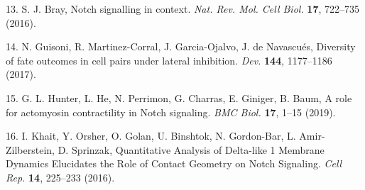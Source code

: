 \documentclass[11pt,singlespacinge,twoside]{reedthesis} %
\begin{document}
\leavevmode\hypertarget{ref-Bray2016}{}%
13. S. J. Bray, Notch signalling in context. \emph{Nat. Rev. Mol. Cell Biol.} \textbf{17}, 722--735 (2016).

\leavevmode\hypertarget{ref-Guisoni2017}{}%
14. N. Guisoni, R. Martinez-Corral, J. Garcia-Ojalvo, J. de Navascués, Diversity of fate outcomes in cell pairs under lateral inhibition. \emph{Dev.} \textbf{144}, 1177--1186 (2017).

\leavevmode\hypertarget{ref-Hunter2019}{}%
15. G. L. Hunter, L. He, N. Perrimon, G. Charras, E. Giniger, B. Baum, A role for actomyosin contractility in Notch signaling. \emph{BMC Biol.} \textbf{17}, 1--15 (2019).

\leavevmode\hypertarget{ref-Khait2016}{}%
16. I. Khait, Y. Orsher, O. Golan, U. Binshtok, N. Gordon-Bar, L. Amir-Zilberstein, D. Sprinzak, Quantitative Analysis of Delta-like 1 Membrane Dynamics Elucidates the Role of Contact Geometry on Notch Signaling. \emph{Cell Rep.} \textbf{14}, 225--233 (2016).
\end{document}
